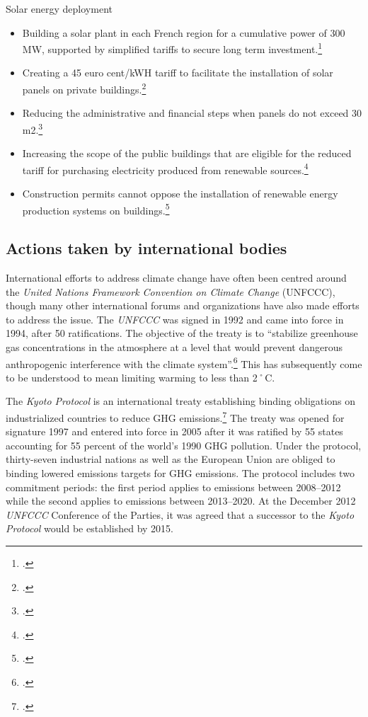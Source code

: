 Solar energy deployment
\begin{itemize}
	\item Building a solar plant in each French region for a cumulative power of 300 MW, supported by simplified tariffs to secure long term investment.\footcite[][]{GrenellePolicies}
	\item Creating a 45 euro cent/kWH tariff to facilitate the installation of solar panels on private buildings.\footcite[][]{GrenellePolicies}
	\item Reducing the administrative and financial steps when panels do not exceed 30 m2.\footcite[][]{GrenellePolicies}
	\item Increasing the scope of the public buildings that are eligible for the reduced tariff for purchasing electricity produced from renewable sources.\footcite[][]{GrenellePolicies}
	\item Construction permits cannot oppose the installation of renewable energy production systems on buildings.\footcite[][]{GrenellePolicies}
\end{itemize}






		\subsection{Actions taken by international bodies}
		
		
		



International efforts to address climate change have often been centred around the \emph{United Nations Framework Convention on Climate Change} (UNFCCC), though many other international forums and organizations have also made efforts to address the issue. 
The \emph{UNFCCC} was signed in 1992 and came into force in 1994, after 50 ratifications.
The objective of the treaty is to ``stabilize greenhouse gas concentrations in the atmosphere at a level that would prevent dangerous anthropogenic interference with the climate system''.\footcite[][Artice 2: "Objective"]{UNFCCC}
This has subsequently come to be understood to mean limiting warming to less than 2˚C.



The \emph{Kyoto Protocol} is an international treaty establishing binding obligations on industrialized countries to reduce GHG emissions.\footcite[][]{KyotoProtocol}
The treaty was opened for signature 1997 and entered into force in 2005 after it was ratified by 55 states accounting for 55 percent of the world's 1990 GHG pollution.
Under the protocol, thirty-seven industrial nations as well as the European Union are obliged to binding lowered emissions targets for GHG emissions.
The protocol includes two commitment periods: the first period applies to emissions between 2008--2012 while the second  applies to emissions between 2013--2020. 
At the December 2012 \emph{UNFCCC} Conference of the Parties, it was agreed that a successor to the \emph{Kyoto Protocol} would be established by 2015.

